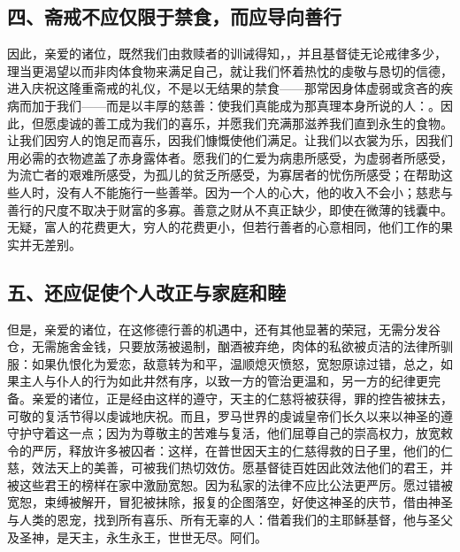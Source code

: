 
\subsection{四、斋戒不应仅限于禁食，而应导向善行}

因此，亲爱的诸位，既然我们由救赎者的训诫得知，，并且基督徒无论戒律多少，理当更渴望以而非肉体食物来满足自己，就让我们怀着热忱的虔敬与恳切的信德，进入庆祝这隆重斋戒的礼仪，不是以无结果的禁食——那常因身体虚弱或贪吝的疾病而加于我们——而是以丰厚的慈善：使我们真能成为那真理本身所说的人：。因此，但愿虔诚的善工成为我们的喜乐，并愿我们充满那滋养我们直到永生的食物。让我们因穷人的饱足而喜乐，因我们慷慨使他们满足。让我们以衣裳为乐，因我们用必需的衣物遮盖了赤身露体者。愿我们的仁爱为病患所感受，为虚弱者所感受，为流亡者的艰难所感受，为孤儿的贫乏所感受，为寡居者的忧伤所感受；在帮助这些人时，没有人不能施行一些善举。因为一个人的心大，他的收入不会小；慈悲与善行的尺度不取决于财富的多寡。善意之财从不真正缺少，即使在微薄的钱囊中。无疑，富人的花费更大，穷人的花费更小，但若行善者的心意相同，他们工作的果实并无差别。\par


\subsection{五、还应促使个人改正与家庭和睦}

但是，亲爱的诸位，在这修德行善的机遇中，还有其他显著的荣冠，无需分发谷仓，无需施舍金钱，只要放荡被遏制，酗酒被弃绝，肉体的私欲被贞洁的法律所驯服：如果仇恨化为爱恋，敌意转为和平，温顺熄灭愤怒，宽恕原谅过错，总之，如果主人与仆人的行为如此井然有序，以致一方的管治更温和，另一方的纪律更完备。亲爱的诸位，正是经由这样的遵守，天主的仁慈将被获得，罪的控告被抹去，可敬的复活节得以虔诚地庆祝。而且，罗马世界的虔诚皇帝们长久以来以神圣的遵守护守着这一点；因为为尊敬主的苦难与复活，他们屈尊自己的崇高权力，放宽敕令的严厉，释放许多被囚者：这样，在普世因天主的仁慈得救的日子里，他们的仁慈，效法天上的美善，可被我们热切效仿。愿基督徒百姓因此效法他们的君王，并被这些君王的榜样在家中激励宽恕。因为私家的法律不应比公法更严厉。愿过错被宽恕，束缚被解开，冒犯被抹除，报复的企图落空，好使这神圣的庆节，借由神圣与人类的恩宠，找到所有喜乐、所有无辜的人：借着我们的主耶稣基督，他与圣父及圣神，是天主，永生永王，世世无尽。阿们。\par

